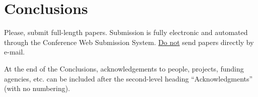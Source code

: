 \documentclass{article}
\begin{document}
\section{Conclusions}
Please, submit full-length papers. Submission is fully electronic and automated through the Conference Web Submission System. \underline{Do not} send papers directly by e-mail.


\begin{acknowledgments}
At the end of the Conclusions, acknowledgements to people, projects, funding agencies, etc. can be included after the second-level heading  ``Acknowledgments'' (with no numbering).
\end{acknowledgments}


\end{document}
